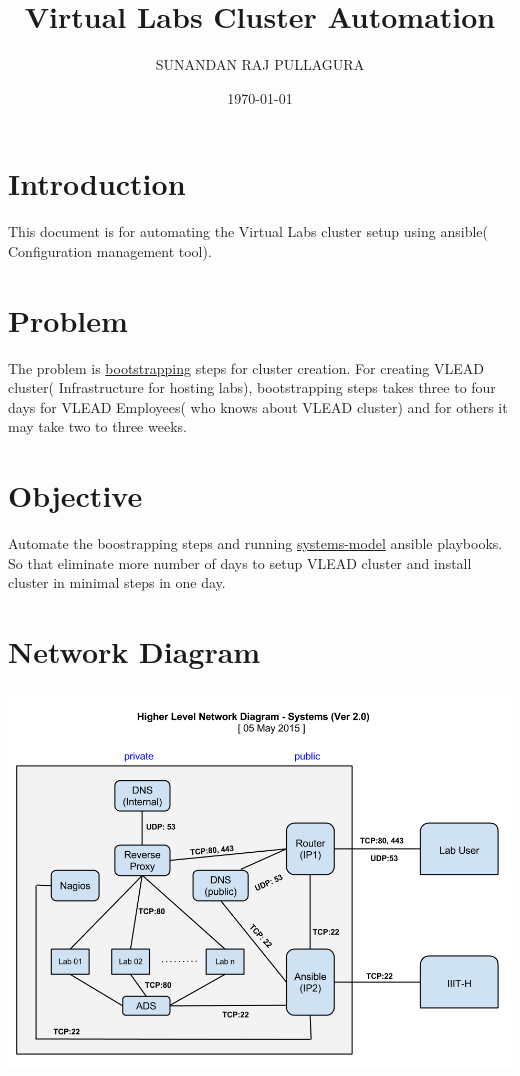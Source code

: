 \documentclass[11pt]{article}
\title{Virtual Labs Cluster Automation}
\author{SUNANDAN RAJ PULLAGURA}
\date{\today}
\begin{document}
\maketitle

\setcounter{tocdepth}{3}
\tableofcontents
\vspace*{1cm}
\section{Introduction}
\label{sec-1}

  This document is for automating the Virtual Labs cluster setup using
  ansible( Configuration management tool).
\section{Problem}
\label{sec-2}

  The problem is \href{https://bitbucket.org/vlead/systems-model/src/fd77adcc24ad68ce22194fad2224adb12c5219ab/src/bootstrapping.org?at%3Ddevelop&fileviewer%3Dfile-view-default}{bootstrapping} steps for cluster creation. For
  creating VLEAD cluster( Infrastructure for hosting labs),
  bootstrapping steps takes three to four days for VLEAD Employees( who
  knows about VLEAD cluster) and for others it may take two to three
  weeks.
\section{Objective}
\label{sec-3}

  Automate the boostrapping steps and running \href{https://bitbucket.org/vlead/systems-model/src/fd77adcc24ad?at%3Ddevelop}{systems-model} ansible
  playbooks. So that eliminate more number of days to setup VLEAD
  cluster and install cluster in minimal steps in one day.
\section{Network Diagram}
\label{sec-4}

  \includegraphics[width=.9\linewidth]{./overall-cluster-network-diagram.png}
\end{document}
